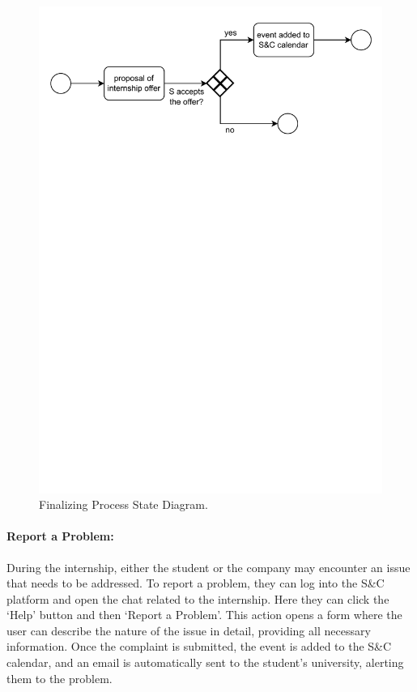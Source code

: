 \begin{figure}[H]
    \begin{center}
        \includegraphics[width=\linewidth]{Images/StateDiagram/FinalizingProcess.pdf}
        \caption{Finalizing Process State Diagram.}
        \label{fig:finalizing_process_state_diag}%
    \end{center}
\end{figure}

\paragraph{Report a Problem:} During the internship, either the student
  or the company may encounter an issue that needs to be addressed. To
  report a problem, they can log into the S\&C platform and open the
  chat related to the internship. Here they can click the `Help' button
  and then `Report a Problem'. This action opens a form where the user can describe the nature of the
  issue in detail, providing all necessary information. Once the complaint
  is submitted, the event is added to the S\&C calendar, and an email is
  automatically sent to the student's university, alerting them to the problem.


